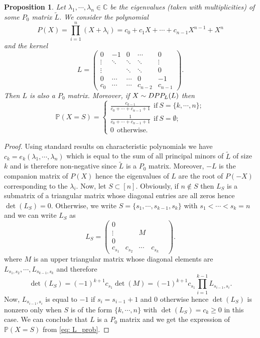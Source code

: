 \documentclass{article}
\numberwithin{equation}{section}
\renewcommand{\geq}{\geqslant}
\renewcommand{\tilde}{\widetilde}
\newcommand{\bP}{\mathbb{P}}
\newcommand{\DPP}{\textnormal{DPP}}
\theoremstyle{plain}
\newtheorem{proposition}{Proposition}[section]
\begin{document}
\begin{proposition}
Let $\lambda_1,\cdots,\lambda_n\in\mathbb{C}$ be the eigenvalues (taken with multiplicities) of some $P_0$ matrix $\tilde L$. We consider the polynomial 
\[P(X)=\prod_{i=1}^n (X+\lambda_i)=c_0+c_1X+\cdots+c_{n-1}X^{n-1}+X^n\]
and the kernel
\begin{equation}\label{eq: Companion_matrix}
L = \begin{pmatrix} 0 & -1 & 0 & \cdots & 0\\
\vdots & \ddots & \ddots & \ddots & \vdots\\
\vdots &  & \ddots & \ddots & 0 \\
0 & \cdots & \cdots & 0 & -1 \\
c_0 & \cdots & \cdots & c_{n-2} & c_{n-1}
\end{pmatrix}.
\end{equation}
Then $L$ is also a $P_0$ matrix. Moreover, if $X\sim \DPP_L(L)$ then
\[\mathbb{P}(X=S)=\left\{\begin{array}{l}
\displaystyle\frac{c_{k-1}}{c_0+\cdots+c_{n-1}+1}~~\mbox{if}~S=\{k,\cdots, n\};\\
\displaystyle\frac{1}{c_0+\cdots+c_{n-1}+1}~~\mbox{if}~S=\emptyset;\\
0~~\mbox{otherwise}.
\end{array}
\right.\]
\end{proposition}
\begin{proof}
Using standard results on characteristic polynomials we have $c_k=e_k(\lambda_1,\cdots, \lambda_n)$ which is equal to the sum of all principal minors of $\tilde L$ of size $k$ \cite[Theorem 1.2.16]{Horn} and is therefore non-negative since $\tilde L$ is a $P_0$ matrix. Moreover, $-L$ is the companion matrix of $P(X)$ hence the eigenvalues of $L$ are the root of $P(-X)$ corresponding to the $\lambda_i$. Now, let $S\subset [n]$. Obviously, if $n\notin S$ then $L_S$ is a submatrix of a triangular matrix whose diagonal entries are all zeros hence $\det(L_S)=0$. Otherwise, we write $S=\{s_1,\cdots,s_{k-1},s_k\}$ with $s_1<\cdots<s_k=n$ and we can write $L_S$ as
\[L_S = \begin{pmatrix} 0 & & & & \\
\vdots & & M & \\
0 & & & \\
c_{s_1} & c_{s_2} & \cdots & c_{s_k}
\end{pmatrix}.\]
where $M$ is an upper triangular matrix whose diagonal elements are $L_{s_1,s_2},\cdots,L_{s_{k-1}, s_k}$ and therefore 
\[\det(L_S)=(-1)^{k+1}c_{s_1}\det(M)=(-1)^{k+1}c_{s_1}\prod_{i=1}^{k-1}L_{s_{i-1}, s_i}.\]
Now, $L_{s_{i-1}, s_i}$ is equal to $-1$ if $s_i=s_{i-1}+1$ and $0$ otherwise hence $\det(L_S)$ is nonzero only when $S$ is of the form $\{k,\cdots, n\}$ with $\det(L_S)=c_k\geq 0$ in this case. We can conclude that $L$ is a $P_0$ matrix and we get the expression of $\bP(X=S)$ from \eqref{eq: L_prob}.
\end{proof}
\end{document}
